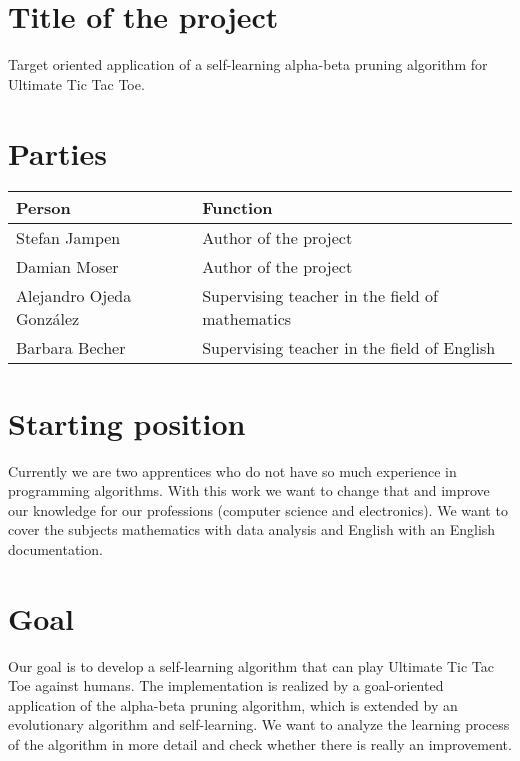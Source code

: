 \section{Title of the project}
Target oriented application of a self-learning alpha-beta pruning algorithm for Ultimate Tic Tac Toe.

\section{Parties}
\begin{tabularx}{\textwidth}{l|X}
\textbf{Person} & \textbf{Function} \\\hline
Stefan Jampen & Author of the project \\
Damian Moser & Author of the project \\
Alejandro Ojeda González & Supervising teacher in the field of mathematics \\
Barbara Becher & Supervising teacher in the field of English \\
\end{tabularx}

\section{Starting position}
Currently we are two apprentices who do not have so much experience in programming algorithms. With this work we want to change that and improve our knowledge for our professions (computer science and electronics). We want to cover the subjects mathematics with data analysis and English with an English documentation.


\section{Goal}
Our goal is to develop a self-learning algorithm that can play Ultimate Tic Tac Toe against humans. The implementation is realized by a goal-oriented application of the alpha-beta pruning algorithm, which is extended by an evolutionary algorithm and self-learning. We want to analyze the learning process of the algorithm in more detail and check whether there is really an improvement.

